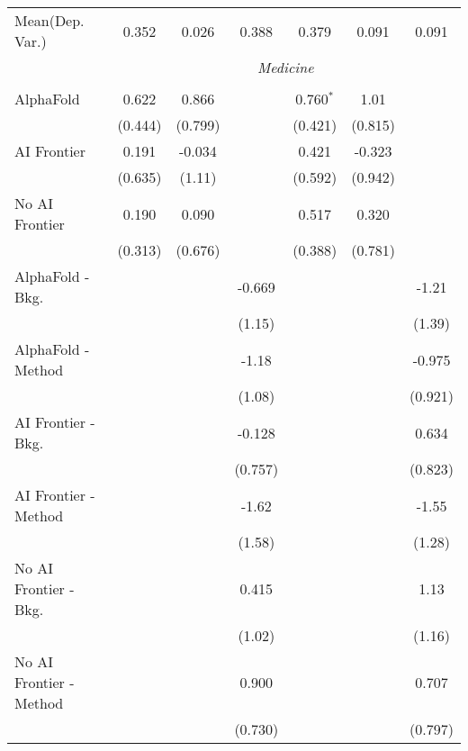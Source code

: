 \begin{tabular}{lcccccc}
Mean(Dep. Var.) & 0.352 & 0.026 & 0.388 & 0.379 & 0.091 & 0.091 \\
 & \multicolumn{6}{c}{\textit{Medicine}} \\ \\
   AlphaFold               & 0.622   & 0.866   &         & 0.760$^{*}$ & 1.01    &   \\   
                           & (0.444) & (0.799) &         & (0.421)     & (0.815) &   \\   
   AI Frontier             & 0.191   & -0.034  &         & 0.421       & -0.323  &   \\   
                           & (0.635) & (1.11)  &         & (0.592)     & (0.942) &   \\   
   No AI Frontier          & 0.190   & 0.090   &         & 0.517       & 0.320   &   \\   
                           & (0.313) & (0.676) &         & (0.388)     & (0.781) &   \\   
   AlphaFold - Bkg.        &         &         & -0.669  &             &         & -1.21\\   
                           &         &         & (1.15)  &             &         & (1.39)\\   
   AlphaFold - Method      &         &         & -1.18   &             &         & -0.975\\   
                           &         &         & (1.08)  &             &         & (0.921)\\   
   AI Frontier - Bkg.      &         &         & -0.128  &             &         & 0.634\\   
                           &         &         & (0.757) &             &         & (0.823)\\   
   AI Frontier - Method    &         &         & -1.62   &             &         & -1.55\\   
                           &         &         & (1.58)  &             &         & (1.28)\\   
   No AI Frontier - Bkg.   &         &         & 0.415   &             &         & 1.13\\   
                           &         &         & (1.02)  &             &         & (1.16)\\   
   No AI Frontier - Method &         &         & 0.900   &             &         & 0.707\\   
                           &         &         & (0.730) &             &         & (0.797)\\   

\end{tabular}
